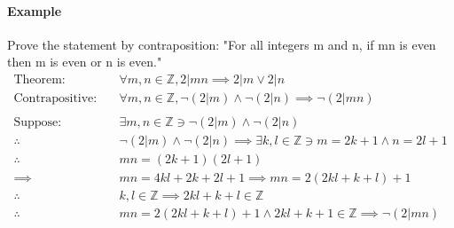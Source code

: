 \paragraph*{Example}
Prove the statement by contraposition: "For all integers m and n, if mn is even then m is even or n is even."
\begin{align*}
    \text{Theorem:} \quad & \forall m, n \in \mathbb{Z}, 2 | mn \implies 2|m \lor 2|n\\
    \text{Contrapositive:} \quad & \forall m, n \in \mathbb{Z}, \neg (2|m) \land \neg(2|n) \implies \neg (2|mn)\\
    \\
    \text{Suppose:} \quad & \exists m, n \in \mathbb{Z} \ni \neg (2|m) \land \neg(2|n)\\
    \therefore \quad & \neg(2|m) \land \neg(2|n) \implies \exists k, l \in \mathbb{Z} \ni m = 2k + 1 \land n = 2l + 1\\
    \therefore \quad & mn = (2k + 1)(2l + 1)\\
    \implies \quad & mn = 4kl + 2k + 2l + 1 \implies mn = 2(2kl + k + l) + 1\\
    \therefore \quad & k,l \in \mathbb{Z} \implies 2kl + k + l \in \mathbb{Z}\\
    \therefore \quad & mn = 2(2kl + k + l) + 1 \land 2kl + k + 1 \in \mathbb{Z} \implies \neg(2|mn)\\
\end{align*}